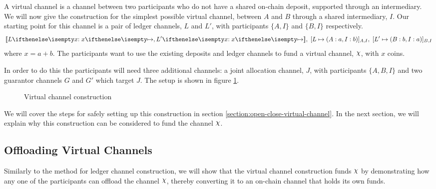 A virtual channel is a channel between two participants who do not have a shared on-chain deposit, supported through an intermediary.
We will now give the construction for the simplest possible virtual channel, between $A$ and $B$ through a shared intermediary, $I$.
Our starting point for this channel is a pair of ledger channels, $L$ and $L'$, with participants $\{A,I\}$ and $\{B,I\}$ respectively.
\begin{align}
  \adj{\holds{L}{x}{}, \holds{L'}{x}{}}, \; \finalizable{L}{\alloc{A:a, I:b}}{A, I}, \; \finalizable{L'}{\alloc{B: b, I: a}}{B, I} \label{eq:virtual-channel-start-state}
\end{align}
where $x = a + b$.
The participants want to use the existing deposits and ledger channels to fund a virtual channel, $\rchi$, with $x$ coins.

In order to do this the participants will need three additional channels: a joint allocation channel, $J$, with participants $\{A, B, I\}$ and two guarantor channels $G$ and $G'$ which target $J$. The setup is shown in figure \ref{fig:virtual-channel-construction}.

\begin{figure}[ht]
  \centering
  
  \caption{Virtual channel construction}
  \label{fig:virtual-channel-construction}
\end{figure}

We will cover the steps for safely setting up this construction in section \ref{section:open-close-virtual-channel}. 
In the next section, we will explain why this construction can be considered to fund the channel $\rchi$.

\subsection{Offloading Virtual Channels}

Similarly to the method for ledger channel construction, we will show that the virtual channel construction funds $\rchi$ by demonstrating how any one of the participants can offload the channel $\rchi$, thereby converting it to an on-chain channel that holds its own funds.

